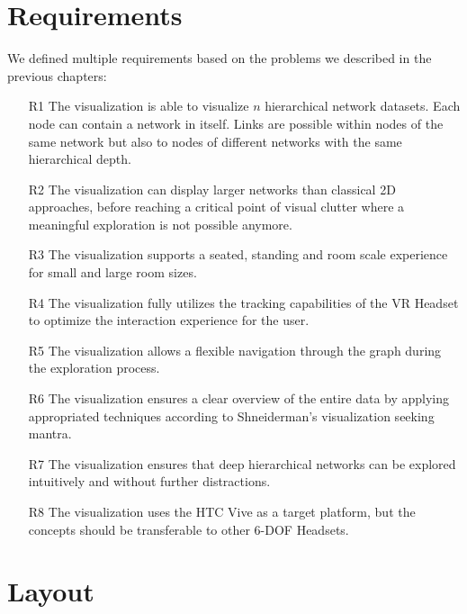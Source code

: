 \section{Requirements}
\label{chap:ps-requirements}
We defined multiple requirements based on the problems we described in the previous chapters:\\
\begin{enumerate}
    \item[R1]\label{req:R1} The visualization is able to visualize $n$ hierarchical network datasets. Each node can contain a network in itself. Links are possible within nodes of the same network but also to nodes of different networks with the same hierarchical depth.
    \item[R2]\label{req:R2} The visualization can display larger networks than classical 2D approaches, before reaching a critical point of visual clutter where a meaningful exploration is not possible anymore.
    \item[R3]\label{req:R3} The visualization supports a seated, standing and room scale experience for small and large room sizes.
    \item[R4]\label{req:R4} The visualization fully utilizes the tracking capabilities of the VR Headset to optimize the interaction experience for the user.
    \item[R5]\label{req:R5} The visualization allows a flexible navigation through the graph during the exploration process.
    \item[R6]\label{req:R6} The visualization ensures a clear overview of the entire data by applying appropriated techniques according to Shneiderman's visualization seeking mantra.
    \item[R7]\label{req:R7} The visualization ensures that deep hierarchical networks can be explored intuitively and without further distractions.
    \item[R8]\label{req:R8} The visualization uses the HTC Vive as a target platform, but the concepts should be transferable to other 6-DOF Headsets. 
\end{enumerate}

\section{Layout}
\label{chap:ps-layout}

